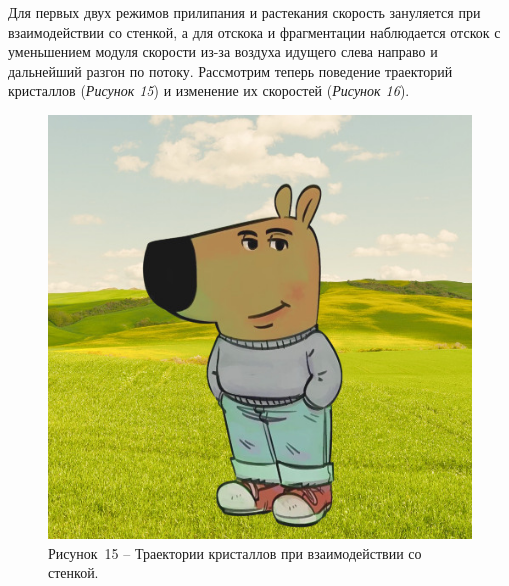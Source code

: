 Для первых двух режимов прилипания и растекания скорость зануляется при взаимодействии со стенкой, а для отскока и фрагментации наблюдается отскок с уменьшением модуля скорости из-за воздуха идущего слева направо и дальнейший разгон по потоку. Рассмотрим теперь поведение траекторий кристаллов (\textit{Рисунок 15}) и изменение их скоростей (\textit{Рисунок 16}).

\begin{figure}[H]
	\centering
	\includegraphics[width=\textwidth]{figures/chill-guy.jpeg}
	\caption*{Рисунок~15 – Траектории кристаллов при взаимодействии со стенкой.}
	\label{fig:-13}
\end{figure}

